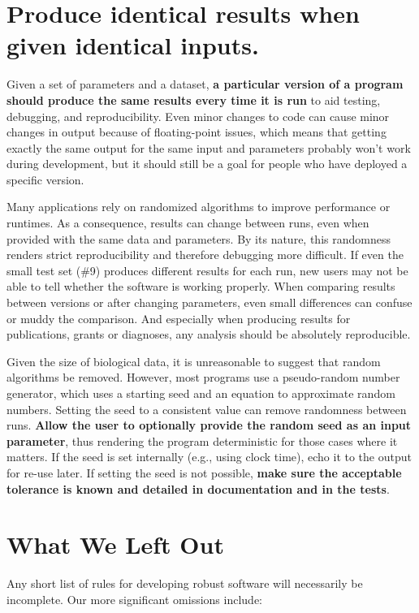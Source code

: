 \documentclass[10pt,letterpaper]{article}
\begin{document}
\section{Produce identical results when given identical inputs.}

Given a set of parameters and a dataset, \textbf{a particular version of a program
should produce the same results every time it is run}
to aid testing, debugging, and reproducibility.
Even minor changes to code can cause minor changes in output because of floating-point issues,
which means that getting exactly the same output for the same input and parameters
probably won't work during development,
but it should still be a goal for people who have deployed a specific version.

Many applications rely on randomized algorithms to
improve performance or runtimes. As a consequence, results can change
between runs, even when provided with the same data and parameters. By
its nature, this randomness renders strict reproducibility and therefore
debugging more difficult. If even the small test set (\#9) produces
different results for each run, new users may not be able to tell whether the software is
working properly. When comparing
results between versions or after changing parameters, even small
differences can confuse or muddy the comparison. And especially when
producing results for publications, grants or diagnoses, any analysis
should be absolutely reproducible.

Given the size of biological data, it is unreasonable to suggest that
random algorithms be removed. However, most programs use a pseudo-random
number generator, which uses a starting seed and an equation to
approximate random numbers. Setting the seed to a consistent value
can remove randomness between runs. \textbf{Allow the user to optionally provide
the random seed as an input parameter}, thus rendering the program deterministic
for those cases where it matters. If the seed is set internally (e.g.,
using clock time), echo it to the output for re-use later. 
If setting the seed is not possible, \textbf{make sure the acceptable tolerance is
known and detailed in documentation and in the tests}.

\section*{What We Left Out}

Any short list of rules for developing robust software will
necessarily be incomplete.   Our more significant omissions
include:
\end{document}
